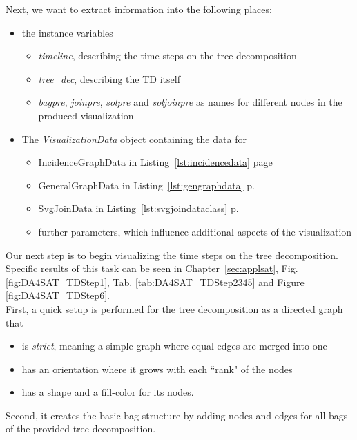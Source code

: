 \documentclass[a4paper, 12pt, bibliography=totoc]{scrartcl}
\begin{document}
Next, we want to extract information into the following places: 
\begin{itemize}
	\item the instance variables 
	\begin{itemize}
		\item \textit{timeline}, describing the time steps on the tree decomposition
		\item \textit{tree\_dec}, describing the TD itself
		\item \textit{bagpre}, \textit{joinpre}, \textit{solpre} and \textit{soljoinpre} as names for different nodes in the produced visualization
	\end{itemize}
	\item The \textit{VisualizationData} object containing the data for 
	\begin{itemize}
		\item IncidenceGraphData in Listing~\ref{lst:incidencedata} page~\pageref{lst:incidencedata}
		\item GeneralGraphData in Listing~\ref{lst:gengraphdata} p.~\pageref{lst:gengraphdata}
		\item SvgJoinData in Listing~\ref{lst:svgjoindataclass} p.~\pageref{lst:svgjoindataclass}
		\item further parameters, which influence additional aspects of the visualization
	\end{itemize}
\end{itemize}

Our next step is to begin visualizing the time steps on the tree decomposition. Specific results of this task can be seen in Chapter~\ref{sec:applsat}, Fig. \ref{fig:DA4SAT_TDStep1}, Tab. \ref{tab:DA4SAT_TDStep2345} and Figure \ref{fig:DA4SAT_TDStep6}.\\

First, a quick setup is performed for the tree decomposition as a directed graph that 
\begin{itemize}
	\item is \textit{strict}, meaning a simple graph where equal edges are merged into one
	\item has an orientation where it grows with each ``rank" of the nodes
	\item has a shape and a fill-color for its nodes.
\end{itemize}

Second, it creates the basic bag structure by adding nodes and edges for all bags of the provided tree decomposition.
\end{document}
